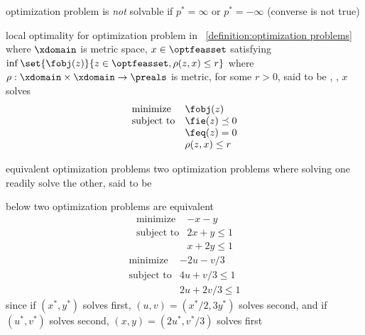 \documentclass[17pt,landscape]{foils}
\begin{document}
{\shrinkspacewithintheoremslike
\bit
\item
	optimization problem is \emph{not} solvable if $p^\ast = \infty$ or $p^\ast = -\infty$
	(converse is not true)
\eit

\begin{mydefinition}{local optimality}
	for optimization problem
	in ~\ref{definition:optimization problems}
	where $\xdomain$ is metric space,
	$x\in\optfeasset$ satisfying
	$
		\inf\set{\fobj(z)}{z\in\optfeasset, \rho(z,x)\leq r}
	$
	where $\rho:\xdomain\times \xdomain\to\preals$ is metric,
	for some $r>0$, said to be ,
	\ie,
	$x$ solves
	$$
		\begin{array}{ll}
			\mbox{minimize}
				& \fobj(z)
			\\\mbox{subject to}&
				\fie(z) \preceq 0
			\\&
				\feq(z) =0
			\\&
				\rho(z,x) \leq r
		\end{array}
	$$
\end{mydefinition}



\begin{mydefinition}{equivalent optimization problems}
	two optimization problems
	where solving one readily solve the other,
	said to be 
\end{mydefinition}

\bit
\item
	below two optimization problems are equivalent
	\bit
	\vitem
		$$
			\begin{array}{ll}
				\mbox{minimize}
					& -x-y
				\\
				\mbox{subject to}
					& 2x+y \leq1
				\\
					& x+2y \leq1
			\end{array}
		$$
	\vitem
		$$
			\begin{array}{ll}
				\mbox{minimize}
					& -2u-v/3
				\\
				\mbox{subject to}
					& 4u+v/3 \leq1
				\\
					& 2u+2v/3 \leq1
			\end{array}
		$$
	\eit
\vitem[]
	since if $(x^\ast, y^\ast)$ solves first,
	$(u,v)=(x^\ast/2, 3y^\ast)$ solves second,
	and if $(u^\ast, v^\ast)$ solves second,
	$(x,y)=(2u^\ast, v^\ast/3)$ solves first
\eit


}
\end{document}
